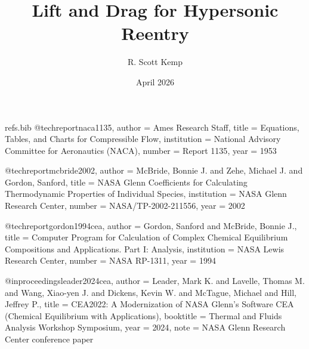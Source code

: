 \begin{filecontents*}{refs.bib}
@techreport{naca1135,
  author       = {{Ames Research Staff}},
  title        = {Equations, Tables, and Charts for Compressible Flow},
  institution  = {National Advisory Committee for Aeronautics (NACA)},
  number       = {Report 1135},
  year         = {1953}
}

@techreport{mcbride2002,
  author       = {McBride, Bonnie J. and Zehe, Michael J. and Gordon, Sanford},
  title        = {NASA Glenn Coefficients for Calculating Thermodynamic Properties of Individual Species},
  institution  = {NASA Glenn Research Center},
  number       = {NASA/TP-2002-211556},
  year         = {2002}
}

@techreport{gordon1994cea,
  author       = {Gordon, Sanford and McBride, Bonnie J.},
  title        = {Computer Program for Calculation of Complex Chemical Equilibrium Compositions and Applications. Part I: Analysis},
  institution  = {NASA Lewis Research Center},
  number       = {NASA RP-1311},
  year         = {1994}
}

@inproceedings{leader2024cea,
  author       = {Leader, Mark K. and Lavelle, Thomas M. and Wang, Xiao-yen J. and Dickens, Kevin W. and McTague, Michael and Hill, Jeffrey P.},
  title        = {CEA2022: A Modernization of NASA Glenn's Software CEA (Chemical Equilibrium with Applications)},
  booktitle    = {Thermal and Fluids Analysis Workshop Symposium},
  year         = {2024},
  note         = {NASA Glenn Research Center conference paper}
}

\end{filecontents*}

\documentclass{article}
\usepackage{graphicx} %
\usepackage{amsmath}
\usepackage{xcolor}
\usepackage{url}
\usepackage{overarrows}

\title{Lift and Drag for Hypersonic Reentry}
\author{R. Scott Kemp}
\date{April 2026}



\maketitle

\section{Purpose}
This is written for you, Amos. It is no longer a drop-in replacement for your write-up about how \texttt{pytrajlib} works, but we can strip out the implementation notes and use it for the publication (or documentation).

